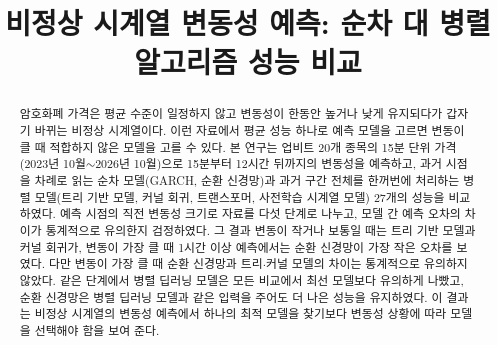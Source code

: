 \documentclass[a4paper]{article}
\begin{document}
\title{비정상 시계열 변동성 예측: 순차 대 병렬 알고리즘 성능 비교}



\begin{abstract}
암호화폐 가격은 평균 수준이 일정하지 않고 변동성이 한동안 높거나 낮게 유지되다가 갑자기 바뀌는 비정상 시계열이다.
이런 자료에서 평균 성능 하나로 예측 모델을 고르면 변동이 클 때 적합하지 않은 모델을 고를 수 있다.
본 연구는 업비트 20개 종목의 15분 단위 가격(2023년 10월$\sim$2026년 10월)으로 15분부터 12시간 뒤까지의 변동성을 예측하고,
과거 시점을 차례로 읽는 순차 모델(GARCH, 순환 신경망)과 과거 구간 전체를 한꺼번에 처리하는 병렬 모델(트리 기반 모델, 커널 회귀, 트랜스포머, 사전학습 시계열 모델) 27개의 성능을 비교하였다.
예측 시점의 직전 변동성 크기로 자료를 다섯 단계로 나누고, 모델 간 예측 오차의 차이가 통계적으로 유의한지 검정하였다.
그 결과 변동이 작거나 보통일 때는 트리 기반 모델과 커널 회귀가, 변동이 가장 클 때 1시간 이상 예측에서는 순환 신경망이 가장 작은 오차를 보였다.
다만 변동이 가장 클 때 순환 신경망과 트리$\cdot$커널 모델의 차이는 통계적으로 유의하지 않았다.
같은 단계에서 병렬 딥러닝 모델은 모든 비교에서 최선 모델보다 유의하게 나빴고, 순환 신경망은 병렬 딥러닝 모델과 같은 입력을 주어도 더 나은 성능을 유지하였다.
이 결과는 비정상 시계열의 변동성 예측에서 하나의 최적 모델을 찾기보다 변동성 상황에 따라 모델을 선택해야 함을 보여 준다.
\end{abstract}

\end{document}
